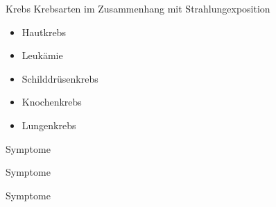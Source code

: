 \begin{frame}{Krebs}
	Krebsarten im Zusammenhang mit Strahlungexposition
\begin{itemize}
	\item Hautkrebs
	\item Leukämie
	\item Schilddrüsenkrebs
	\item Knochenkrebs
	\item Lungenkrebs
\end{itemize}
\end{frame}
\begin{frame}{Symptome}
	
\end{frame}
\begin{frame}{Symptome}
	
\end{frame}
\begin{frame}{Symptome}
	
\end{frame}
